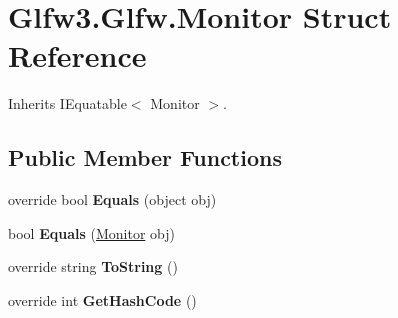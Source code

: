 \hypertarget{struct_glfw3_1_1_glfw_1_1_monitor}{}\section{Glfw3.\+Glfw.\+Monitor Struct Reference}
\label{struct_glfw3_1_1_glfw_1_1_monitor}


 




Inherits I\+Equatable$<$ Monitor $>$.

\subsection*{Public Member Functions}
\begin{DoxyCompactItemize}
\item 
\mbox{\label{struct_glfw3_1_1_glfw_1_1_monitor_a2311e1f2fefcce6179c846fa28cfba9b}} 
override bool {\bfseries Equals} (object obj)
\item 
\mbox{\label{struct_glfw3_1_1_glfw_1_1_monitor_a91d4c8807a90c4b7ed459ac6652afe40}} 
bool {\bfseries Equals} (\mbox{\hyperlink{struct_glfw3_1_1_glfw_1_1_monitor}{Monitor}} obj)
\item 
\mbox{\label{struct_glfw3_1_1_glfw_1_1_monitor_a6be4ff39d4a5d307c9c3b8ce9b034f45}} 
override string {\bfseries To\+String} ()
\item 
\mbox{\label{struct_glfw3_1_1_glfw_1_1_monitor_a1a1b5015d2b769b6fb700b5923c1a57f}} 
override int {\bfseries Get\+Hash\+Code} ()
\end{DoxyCompactItemize}
